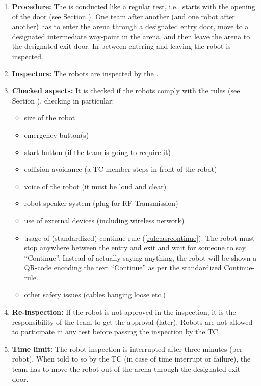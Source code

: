 \begin{enumerate}
	\item \textbf{Procedure:} The  is conducted like a regular test, i.e., starts with the opening of the door (see Section ). One team after another (and one robot after another) has to enter the arena through a designated entry door, move to a designated intermediate way-point in the arena, and then leave the arena to the designated exit door. In between entering and leaving the robot is inspected.
	\item \textbf{Inspectors:} The robots are inspected by the .
	\item \textbf{Checked aspects:} It is checked if the robots comply with the rules (see Section ), checking in particular:
	\begin{itemize}
		\item size of the robot
		\item emergency button(s)
		\item start button (if the team is going to require it)
		\item collision avoidance (a TC member steps in front of the robot)
		\item voice of the robot (it must be loud and clear)
		\item robot speaker system (plug for RF Transmission)
		\item use of external devices (including wireless network)
		\item usage of (standardized) continue rule (\ref{rule:asrcontinue}). The robot must stop anywhere between the entry and exit and wait for someone to say ``Continue''. 
		  Instead of actually saying anything, the robot will be shown a QR-code encoding the text ``Continue'' as per the standardized Continue-rule. 
		\item other safety issues (cables hanging loose etc.)
	\end{itemize}
	\item \textbf{Re-inspection:} If the robot is not approved in the inspection, it is the responsibility of the team to get the approval (later). Robots are not allowed to participate in any test before passing the inspection by the TC.
	\item \textbf{Time limit:} The robot inspection is interrupted after three minutes (per robot). When told to so by the TC (in case of time interrupt or failure), the team has to move the robot out of the arena through the designated exit door.

\end{enumerate}

